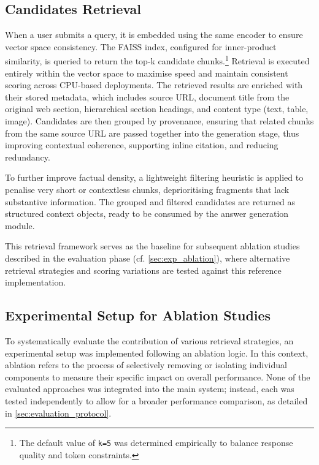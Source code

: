 \begin{spacing}{1.5}
\section{Candidates Retrieval}
When a user submits a query, it is embedded using the same encoder to ensure vector space consistency. The FAISS index, configured for inner-product similarity, is queried to return the top-k candidate chunks.\footnote{The default value of \texttt{k=5} was determined empirically to balance response quality and token constraints.} Retrieval is executed entirely within the vector space to maximise speed and maintain consistent scoring across CPU-based deployments. The retrieved results are enriched with their stored metadata, which includes source URL, document title from the original web section, hierarchical section headings, and content type (text, table, image). Candidates are then grouped by provenance, ensuring that related chunks from the same source URL are passed together into the generation stage, thus improving contextual coherence, supporting inline citation, and reducing redundancy.

To further improve factual density, a lightweight filtering heuristic is applied to penalise very short or contextless chunks, deprioritising fragments that lack substantive information. The grouped and filtered candidates are returned as structured context objects, ready to be consumed by the answer generation module. 

This retrieval framework serves as the baseline for subsequent ablation studies described in the evaluation phase (cf. \autoref{sec:exp_ablation}), where alternative retrieval strategies and scoring variations are tested against this reference implementation.

\subsection{Experimental Setup for Ablation Studies}\label{sec:exp_ablation}
To systematically evaluate the contribution of various retrieval strategies, an experimental setup was implemented following an ablation logic. In this context, ablation refers to the process of selectively removing or isolating individual components to measure their specific impact on overall performance. None of the evaluated approaches was integrated into the main system; instead, each was tested independently to allow for a broader performance comparison, as detailed in \autoref{sec:evaluation_protocol}. 


\end{spacing}
